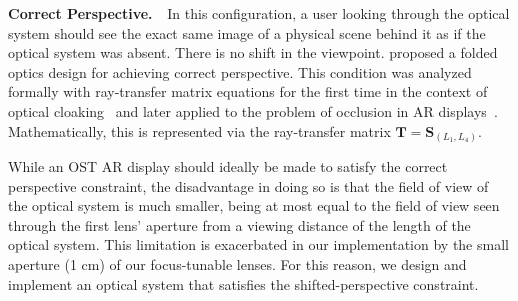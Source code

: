 {\bf Correct Perspective. $\,\,$}
In this configuration, a user looking through the optical system should see the exact same image of a physical scene behind it as if the optical system was absent. There is no shift in the viewpoint. \citet{Kiyokawa2003} proposed a folded optics design for achieving correct perspective. This condition was analyzed formally with ray-transfer matrix equations for the first time in the context of optical cloaking~\cite{Choi2015} and later applied to the problem of occlusion in AR displays~\cite{Howlett2017}. Mathematically, this is represented via the ray-transfer matrix $\mathbf{T} = \mathbf{S}_{(L_1,L_4)}$.

While an OST AR display should ideally be made to satisfy the correct perspective constraint, the disadvantage in doing so is that the field of view of the optical system is much smaller, being at most equal to the field of view seen through the first lens' aperture from a viewing distance of the length of the optical system. This limitation is exacerbated in our implementation by the small aperture (1 cm) of our focus-tunable lenses. For this reason, we design and implement an optical system that satisfies the shifted-perspective constraint. 



